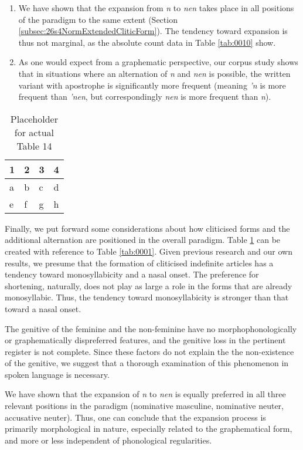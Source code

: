 \begin{enumerate}
	\item We have shown that the expansion from \textit{n} to \textit{nen} takes place in all positions of the paradigm to the same extent (Section \ref{subsec:26s4NormExtendedCliticForm}).
	The tendency toward expansion is thus not marginal, as the absolute count data in Table \ref{tab:0010} show.
	\item As one would expect from a graphematic perspective, our corpus study shows that in situations where an alternation of \textit{n} and \textit{nen} is possible, the written variant with apostrophe is significantly more frequent (meaning \textit{'n} is more frequent than \textit{'nen}, but correspondingly \textit{nen} is more frequent than \textit{n}).
\end{enumerate}

\begin{table}
	\centering
	\begin{tabular}{llll}
		\toprule
		\textbf{1} & \textbf{2} & \textbf{3} & \textbf{4} \\
		\midrule
		a & b & c & d \\
		e & f & g & h \\
		\bottomrule
	\end{tabular}
	\caption{Placeholder for actual Table 14}
	\label{tab:0014}
\end{table}

Finally, we put forward some considerations about how cliticised forms and the additional alternation are positioned in the overall paradigm.
Table \ref{tab:0014} can be created with reference to Table \ref{tab:0001}. %
Given previous research and our own results, we presume that the formation of cliticised indefinite articles has a tendency toward monosyllabicity and a nasal onset.
The preference for shortening, naturally, does not play as large a role in the forms that are already monosyllabic.
Thus, the tendency toward monosyllabicity is stronger than that toward a nasal onset.

The genitive of the feminine and the non-feminine have no morphophonologically or graphematically dispreferred features, and the genitive loss in the pertinent register is not complete. 
Since these factors do not explain the the non-existence of the genitive, we suggest that a thorough examination of this phenomenon in spoken language is necessary.

We have shown that the expansion of \textit{n} to \textit{nen} is equally preferred in all three relevant positions in the paradigm (nominative masculine, nominative neuter, accusative neuter).
Thus, one can conclude that the expansion process is primarily morphological in nature, especially related to the graphematical form, and more or less independent of phonological regularities.

